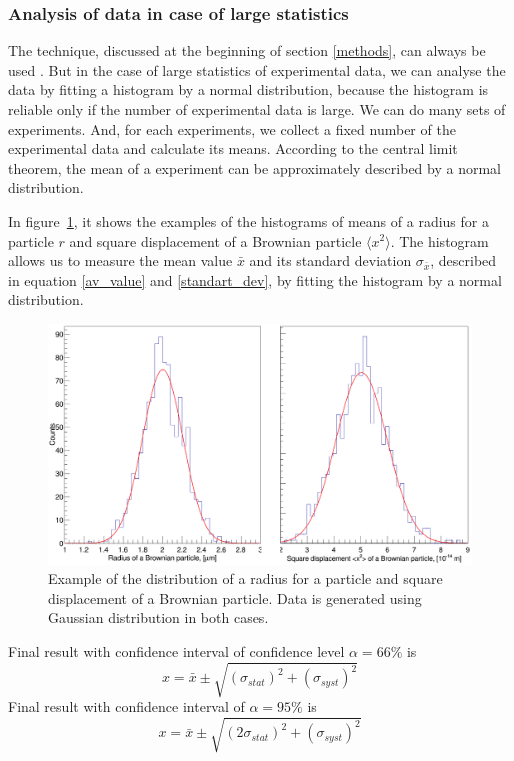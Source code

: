 \documentclass[12pt,a4paper]{report}
\begin{document}
\subsubsection{Analysis of data in case of large statistics}
The technique, discussed at the beginning of section \ref{methods}, can always be used .
But in the case of large statistics of experimental data, we can analyse the data by fitting a histogram by a normal distribution, because the histogram is reliable only if the number of experimental data is large.
We can do many sets of experiments.
And, for each experiments, we collect a fixed number of the experimental data and calculate its means.
According to the central limit theorem, the mean of a experiment can be approximately described by a normal distribution.

In figure~\ref{fig:radius_distribution}, it shows the examples of the histograms of means of a radius for a particle $r$ and square displacement of a Brownian particle $\langle x^2 \rangle$.
The histogram allows us to measure the mean value $\bar{x}$ and its standard deviation $\sigma_{\bar{x}}$, described in equation \ref{av_value} and \ref{standart_dev}, by fitting the histogram by a normal distribution.

\begin{figure}[!h]
\begin{center}
\includegraphics*[scale = 0.25]{Figures/two_plots}
\caption{\label{fig:radius_distribution} Example of the distribution of a radius for a particle and square displacement of a Brownian particle. Data is generated using Gaussian distribution in both cases.}
\end{center}
\end{figure}

Final result with confidence interval of confidence level $\alpha = 66 \%$ is
\begin{equation*}
x = \bar{x} \pm \sqrt{ (\sigma_{stat})^2 + (\sigma_{syst})^2 }
\end{equation*}
Final result with confidence interval of $\alpha = 95 \%$ is
\begin{equation*}
x = \bar{x} \pm \sqrt{ (2\sigma_{stat})^2 + (\sigma_{syst})^2}
\end{equation*}
\end{document}
